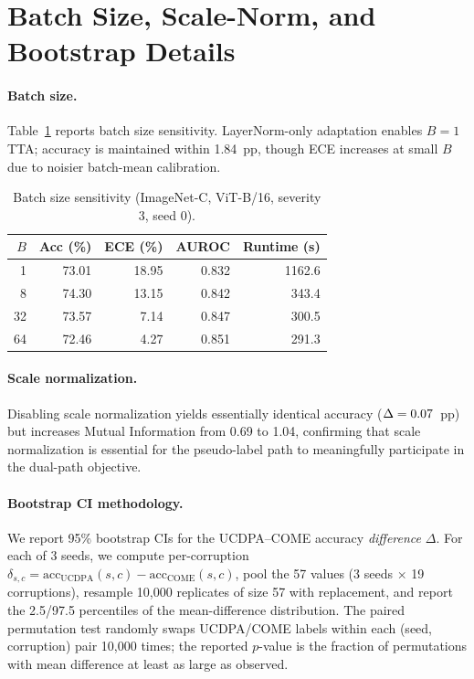 \section{Batch Size, Scale-Norm, and Bootstrap Details}
\label{app:supplementary}

\paragraph{Batch size.}
Table~\ref{tab:batch-size-full} reports batch size sensitivity. LayerNorm-only adaptation enables $B=1$ TTA; accuracy is maintained within 1.84~pp, though ECE increases at small $B$ due to noisier batch-mean calibration.

\begin{table}[h]
\centering
\caption{Batch size sensitivity (ImageNet-C, ViT-B/16, severity 3, seed 0).}
\label{tab:batch-size-full}
\begin{tabular}{rrrrr}
\toprule
$B$ & Acc (\%) & ECE (\%) & AUROC & Runtime (s) \\
\midrule
1  & 73.01 & 18.95 & 0.832 & 1162.6 \\
8  & 74.30 & 13.15 & 0.842 & 343.4 \\
32 & 73.57 & 7.14  & 0.847 & 300.5 \\
64 & 72.46 & 4.27  & 0.851 & 291.3 \\
\bottomrule
\end{tabular}
\end{table}

\paragraph{Scale normalization.}
Disabling scale normalization yields essentially identical accuracy ($\Delta=0.07{}$~pp) but increases Mutual Information from 0.69 to 1.04, confirming that scale normalization is essential for the pseudo-label path to meaningfully participate in the dual-path objective.

\paragraph{Bootstrap CI methodology.}
We report 95\% bootstrap CIs for the UCDPA--COME accuracy \emph{difference} $\Delta$. For each of 3 seeds, we compute per-corruption $\delta_{s,c} = \mathrm{acc}_\mathrm{UCDPA}(s,c) - \mathrm{acc}_\mathrm{COME}(s,c)$, pool the 57 values (3 seeds $\times$ 19 corruptions), resample 10{,}000 replicates of size 57 with replacement, and report the 2.5/97.5 percentiles of the mean-difference distribution. The paired permutation test randomly swaps UCDPA/COME labels within each (seed, corruption) pair 10{,}000 times; the reported $p$-value is the fraction of permutations with mean difference at least as large as observed.


